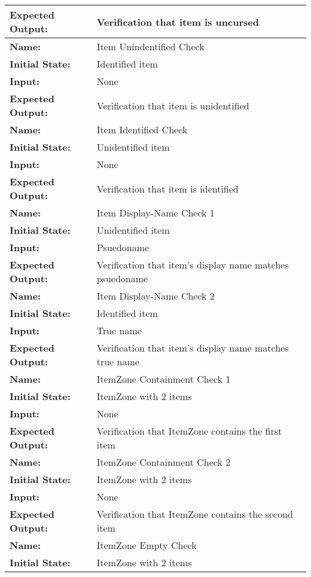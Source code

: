 \documentclass[12pt, titlepage]{article}
\begin{document}
\begin{center}
\begin{longtable}{ l | p{10cm} }
				\textbf{Expected Output:} & Verification that item is uncursed\\
				\hline
				\textbf{Name:} & Item Unindentified Check\\
				\textbf{Initial State:} & Identified item\\
				\textbf{Input:} & None\\
				\textbf{Expected Output:} & Verification that item is unidentified\\
				\hline
				\textbf{Name:} & Item Identified Check\\
				\textbf{Initial State:} & Unidentified item\\
				\textbf{Input:} & None\\
				\textbf{Expected Output:} & Verification that item is identified\\
				\hline
				\textbf{Name:} & Item Display-Name Check 1\\
				\textbf{Initial State:} & Unidentified item\\
				\textbf{Input:} & Psuedoname\\
				\textbf{Expected Output:} & Verification that item's display name matches psuedoname\\
				\hline
				\textbf{Name:} & Item Display-Name Check 2\\
				\textbf{Initial State:} & Identified item\\
				\textbf{Input:} & True name\\
				\textbf{Expected Output:} & Verification that item's display name matches true name\\
				\hline
				\textbf{Name:} & ItemZone Containment Check 1\\
				\textbf{Initial State:} & ItemZone with 2 items\\
				\textbf{Input:} & None\\
				\textbf{Expected Output:} & Verification that ItemZone contains the first item\\
				\hline
				\textbf{Name:} & ItemZone Containment Check 2\\
				\textbf{Initial State:} & ItemZone with 2 items\\
				\textbf{Input:} & None\\
				\textbf{Expected Output:} & Verification that ItemZone contains the second item\\
				\hline
				\textbf{Name:} & ItemZone Empty Check\\
				\textbf{Initial State:} & ItemZone with 2 items\\

\end{longtable}
\end{center}
\end{document}
